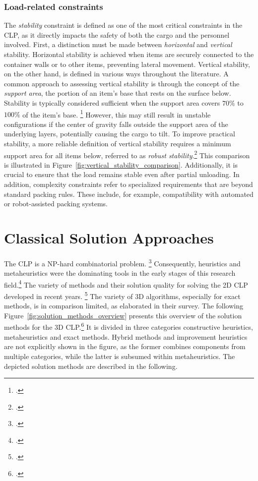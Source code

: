 \subsubsection{Load-related constraints}

The \textit{stability} constraint is defined as one of the most critical constraints
in the \gls{CLP}, as it directly impacts the safety of both the cargo and the personnel involved.
First, a distinction must be made between \textit{horizontal} and \textit{vertical} stability.
Horizontal stability is achieved when items are securely connected to the
container walls or to other items, preventing lateral movement. Vertical
stability, on the other hand, is defined in various ways throughout the
literature. A common approach to assessing vertical stability is through the concept of the \textit{support
    area}, the portion of an item's base that rests on the surface below. Stability is typically
considered sufficient when the support area covers $70\%$ to $100\%$ of the item’s base. \footcite[cf.][p. 344]{gendreau_tabu_2006} However,
this may still result in unstable configurations if the center of gravity falls outside the
support area of the underlying layers, potentially causing the cargo to tilt. To improve practical stability,
a more reliable definition of vertical stability requires a minimum support area for all items below,
referred to as \textit{robust stability}.\footcite[cf.][p. 1140]{ceschia_local_2013} This comparison is illustrated in Figure~\ref{fig:vertical_stability_comparison}.
Additionally, it is crucial to ensure that the load remains stable even after partial unloading.
In addition, complexity constraints refer to specialized
requirements that are beyond standard packing rules. These include, for example, compatibility with automated or robot-assisted packing systems.




\section{Classical Solution Approaches}
\label{sec:classical_solution_approaches}
The \gls{CLP} is a NP-hard combinatorial problem. \footcite[cf.][p. 11]{bortfeldt_constraints_2013}
Consequently, heuristics and metaheuristics were the dominating tools
in the early stages of this research field.\footcite[cf.][]{pisinger_heuristics_2002} The variety of methods
and their solution quality for solving the 2D \gls{CLP} developed in recent years. \footcite[cf.][p. 23]{iori_exact_2021}
The variety of 3D algorithms, especially for exact methods, is in comparison limited, as
\textcite{zhao_comparative_2016} elaborated in their survey. The following Figure~\ref{fig:solution_methods_overview}
presents this overview of the solution methods for the 3D \gls{CLP}.\footcite[cf.][]{zhao_comparative_2016}
It is divided in three categories constructive heuristics, metaheuristics
and exact methods. Hybrid methods and improvement heuristics are not explicitly shown in the figure,
as the former combines components from multiple categories, while the latter is subsumed within
metaheuristics. The depicted solution methods are described in the following.

